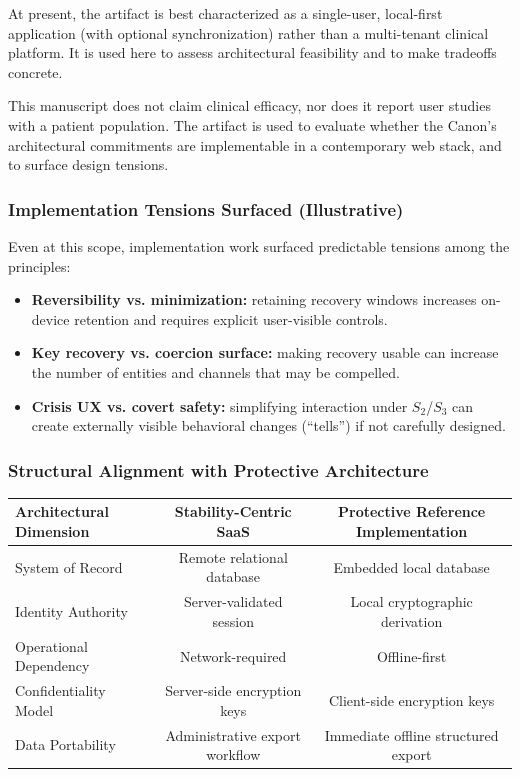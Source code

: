 \documentclass[12pt]{article}
\begin{document}
At present, the artifact is best characterized as a single-user, local-first application (with optional synchronization) rather than a multi-tenant clinical platform. It is used here to assess architectural feasibility and to make tradeoffs concrete.

This manuscript does not claim clinical efficacy, nor does it report user studies with a patient population. The artifact is used to evaluate whether the Canon's architectural commitments are implementable in a contemporary web stack, and to surface design tensions.

\subsubsection{Implementation Tensions Surfaced (Illustrative)}
Even at this scope, implementation work surfaced predictable tensions among the principles:
\begin{itemize}
\item \textbf{Reversibility vs. minimization:} retaining recovery windows increases on-device retention and requires explicit user-visible controls.
\item \textbf{Key recovery vs. coercion surface:} making recovery usable can increase the number of entities and channels that may be compelled.
\item \textbf{Crisis UX vs. covert safety:} simplifying interaction under $S_2$/$S_3$ can create externally visible behavioral changes (``tells'') if not carefully designed.
\end{itemize}

\subsubsection{Structural Alignment with Protective Architecture}
\begin{center}
\begin{tabular}{@{}lcc@{}}
\toprule
Architectural Dimension & Stability-Centric SaaS & Protective Reference Implementation \\
\midrule
System of Record & Remote relational database & Embedded local database \\
Identity Authority & Server-validated session & Local cryptographic derivation \\
Operational Dependency & Network-required & Offline-first \\
Confidentiality Model & Server-side encryption keys & Client-side encryption keys \\
Data Portability & Administrative export workflow & Immediate offline structured export \\
\bottomrule
\end{tabular}
\end{center}
\end{document}
